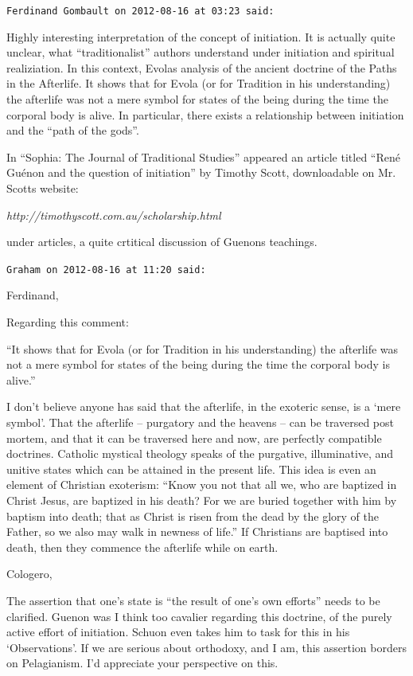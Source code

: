 \begin{footnotesize}
\begin{sffamily}
\texttt{Ferdinand Gombault on 2012-08-16 at 03:23 said:}

Highly interesting interpretation of the concept of initiation. It is actually quite unclear, what ``traditionalist'' authors understand under initiation and spiritual realiziation. In this context, Evolas analysis of the ancient doctrine of the Paths in the Afterlife. It shows that for Evola (or for Tradition in his understanding) the afterlife was not a mere symbol for states of the being during the time the corporal body is alive. In particular, there exists a relationship between initiation and the ``path of the gods''.

In ``Sophia: The Journal of Traditional Studies'' appeared an article titled ``René Guénon and the question of initiation'' by Timothy Scott, downloadable on Mr. Scotts website:

\textit{http://timothyscott.com.au/scholarship.html}

under articles, a quite crtitical discussion of Guenons teachings.

\hfill

\texttt{Graham on 2012-08-16 at 11:20 said:}

Ferdinand,

Regarding this comment:

``It shows that for Evola (or for Tradition in his understanding) the afterlife was not a mere symbol for states of the being during the time the corporal body is alive.''

I don't believe anyone has said that the afterlife, in the exoteric sense, is a `mere symbol'. That the afterlife -- purgatory and the heavens -- can be traversed post mortem, and that it can be traversed here and now, are perfectly compatible doctrines. Catholic mystical theology speaks of the purgative, illuminative, and unitive states which can be attained in the present life. This idea is even an element of Christian exoterism: ``Know you not that all we, who are baptized in Christ Jesus, are baptized in his death? For we are buried together with him by baptism into death; that as Christ is risen from the dead by the glory of the Father, so we also may walk in newness of life.'' If Christians are baptised into death, then they commence the afterlife while on earth.

Cologero,

The assertion that one's state is ``the result of one's own efforts'' needs to be clarified. Guenon was I think too cavalier regarding this doctrine, of the purely active effort of initiation. Schuon even takes him to task for this in his `Observations'. If we are serious about orthodoxy, and I am, this assertion borders on Pelagianism. I'd appreciate your perspective on this.


\end{sffamily}
\end{footnotesize}
